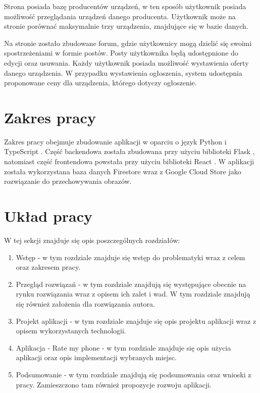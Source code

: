 Strona posiada bazę producentów urządzeń, w ten sposób użytkownik posiada możliwość przeglądania urządzeń danego producenta. Użytkownik może na stronie porównać maksymalnie trzy urządzenia, znajdujące się w bazie danych.

Na stronie zostało zbudowane forum, gdzie użytkownicy mogą dzielić się swoimi spostrzeżeniami w formie postów. Posty użytkownika będą udostępnione do edycji oraz usuwania. Każdy użytkownik posiada możliwość wystawienia oferty danego urządzenia. W przypadku wystawienia ogłoszenia, system udostępnia proponowane ceny dla urządzenia, którego dotyczy ogłoszenie.

\section{Zakres pracy}
Zakres pracy obejmuje zbudowanie aplikacji w oparciu o język Python \cite{python} i \linebreak TypeScript \cite{TypeScript}. Część backendowa została zbudowana przy użyciu biblioteki Flask \cite{flask}, natomiast część frontendowa powstała przy użyciu biblioteki React \cite{React}. W aplikacji została wykorzystana baza danych Firestore wraz z Google Cloud Store jako rozwiązanie do przechowywania obrazów. 

\section{Układ pracy}
W tej sekcji znajduje się opis poszczególnych rozdziałów:
\begin{enumerate}
  \item Wstęp - w tym rozdziale znajduje się wstęp do problematyki wraz z celem oraz zakresem pracy.
  \item Przegląd rozwiązań - w tym rozdziale znajdują się występujące obecnie na rynku rozwiązania wraz z opisem ich zalet i wad. W tym rozdziale znajdują się również założenia dla rozwiązania autora.
  \item Projekt aplikacji - w tym rozdziale znajduje się opis projektu aplikacji wraz z opisem wykorzystanych technologii.
  \item Aplikacja - Rate my phone - w tym rozdziale znajduje się opis użycia aplikacji oraz opis implementacji wybranych miejsc.
  \item Podsumowanie - w tym rozdziale znajdują się podsumowania oraz wnioski z pracy. Zamieszczono tam również propozycje rozwoju aplikacji.
\end{enumerate}
